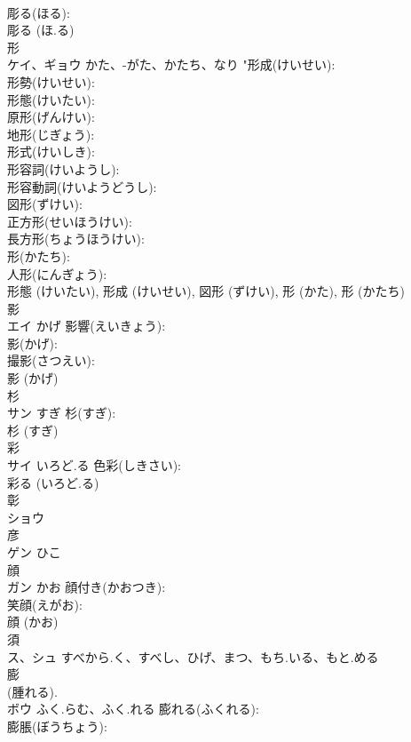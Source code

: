 \documentclass[8pt]{extreport}
\begin{document}
\begin{CJK}{UTF8}{min}
\\	彫る(ほる): 
\\	彫る (ほ.る)
\\	形			
\\	ケイ、ギョウ	かた、-がた、かたち、なり	"形成(けいせい): 
\\	形勢(けいせい): 
\\	形態(けいたい): 
\\	原形(げんけい): 
\\	地形(じぎょう): 
\\	形式(けいしき): 
\\	形容詞(けいようし): 
\\	形容動詞(けいようどうし): 
\\	図形(ずけい): 
\\	正方形(せいほうけい): 
\\	長方形(ちょうほうけい): 
\\	形(かたち): 
\\	人形(にんぎょう): 
\\	形態 (けいたい), 形成 (けいせい), 図形 (ずけい), 形 (かた), 形 (かたち)
\\	影			
\\	エイ	かげ	影響(えいきょう): 
\\	影(かげ): 
\\	撮影(さつえい): 
\\	影 (かげ)
\\	杉			
\\	サン	すぎ	杉(すぎ): 
\\	杉 (すぎ)
\\	彩			
\\	サイ	いろど.る	色彩(しきさい): 
\\	彩る (いろど.る)
\\	彰			
\\	ショウ			
\\	彦			
\\	ゲン	ひこ		
\\	顔			
\\	ガン	かお	顔付き(かおつき): 
\\	笑顔(えがお): 
\\	顔 (かお)
\\	須			
\\	ス、シュ	すべから.く、すべし、ひげ、まつ、もち.いる、もと.める		
\\	膨			
\\	(腫れる). 
\\	ボウ	ふく.らむ、ふく.れる	膨れる(ふくれる): 
\\	膨脹(ぼうちょう): 

\end{CJK}
\end{document}
